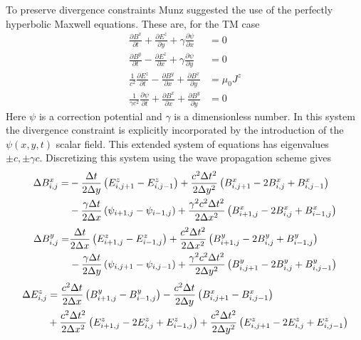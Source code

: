 \documentclass[11pt, reqno]{amsart}
\newcommand{\pfrac}[2]{\frac{\partial #1}{\partial #2}}
\begin{document}
To preserve divergence constraints Munz suggested the use of the
perfectly hyperbolic Maxwell equations. These are, for the TM case
\begin{align}
  \pfrac{B^x}{t} + \pfrac{E^z}{y} + \gamma\pfrac{\psi}{x} &= 0 \\
  \pfrac{B^y}{t} - \pfrac{E^z}{x} + \gamma\pfrac{\psi}{y} &= 0 \\
  \frac{1}{c^2}\pfrac{E^z}{t} - \pfrac{B^y}{x} + \pfrac{B^x}{y} &=
  \mu_0 J^z \\
  \frac{1}{\gamma c^2}\pfrac{\psi}{t} + \pfrac{B^x}{x} +
  \pfrac{B^y}{y} &= 0
\end{align}
Here $\psi$ is a correction potential and $\gamma$ is a dimensionless
number. In this system the divergence constraint is explicitly
incorporated by the introduction of the $\psi(x,y,t)$ scalar field.
This extended system of equations has eigenvalues $\pm c, \pm \gamma
c$. Discretizing this system using the wave propagation scheme gives
\begin{align}
  \Delta B^x_{i,j} = &-\frac{\Delta t}{2\Delta y}
  \left(
    E^z_{i,j+1} - E^z_{i,j-1}
  \right)
  +
  \frac{c^2 \Delta t^2}{2\Delta y^2}
  \left(
    B^x_{i,j+1} - 2B^x_{i,j} + B^x_{i,j-1}
  \right) \notag \\
  &-
  \frac{\gamma \Delta t}{2\Delta x}
  \left(
    \psi_{i+1,j}-\psi_{i-1,j}
  \right)
  +
  \frac{\gamma^2 c^2 \Delta t^2}{2\Delta x^2}
  \left(
    B^x_{i+1,j} - 2B^x_{i,j} + B^x_{i-1,j}
  \right)
\end{align}
\begin{align}
  \Delta B^y_{i,j} = 
  &\frac{\Delta t}{2\Delta x}
  \left(
    E^z_{i+1,j} - E^z_{i-1,j}
  \right)
  + \frac{c^2 \Delta t^2}{2\Delta x^2}
  \left(
    B^y_{i+1,j} - 2B^y_{i,j} + B^y_{i-1,j}
  \right) \notag \\
  &
  -
  \frac{\gamma \Delta t}{2\Delta y}
  \left(
    \psi_{i,j+1}-\psi_{i,j-1}
  \right)
  +
  \frac{\gamma^2 c^2 \Delta t^2}{2\Delta y^2}
  \left(
    B^y_{i,j+1} - 2B^y_{i,j} + B^y_{i,j-1}
  \right)  
\end{align}
\begin{align}
  \Delta E^z_{i,j} &= \frac{c^2 \Delta t}{2\Delta x}
  \left(
    B^y_{i+1,j} - B^y_{i-1,j}
  \right)
  -\frac{c^2 \Delta t}{2\Delta y}
  \left(
    B^x_{i,j+1} - B^x_{i,j-1}
  \right) \notag \\
  &+ \frac{c^2 \Delta t^2}{2\Delta x^2}
  \left(
    E^z_{i+1,j} - 2E^z_{i,j} + E^z_{i-1,j}
  \right)
  + \frac{c^2 \Delta t^2}{2\Delta y^2}
  \left(
    E^z_{i,j+1} - 2E^z_{i,j} + E^z_{i,j-1}
  \right)
\end{align}
\end{document}
